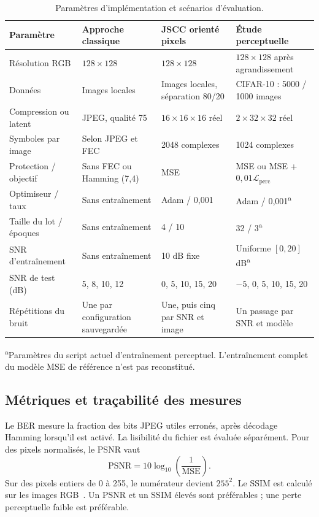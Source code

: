 \documentclass[conference]{IEEEtran}
\begin{document}
\begin{table}[!t]
\centering
\caption{Paramètres d'implémentation et scénarios d'évaluation.}
\label{tab:settings}
\setlength{\tabcolsep}{5pt}
\begin{tabular}{p{3.4cm}p{3.6cm}p{3.8cm}p{4.5cm}}
\toprule
Paramètre & Approche classique & JSCC orienté pixels & Étude perceptuelle \\
\midrule
Résolution RGB & $128\times128$ & $128\times128$ & $128\times128$ après agrandissement \\
Données & Images locales & Images locales, séparation 80/20 & CIFAR-10 : 5000 / 1000 images \\
Compression ou latent & JPEG, qualité 75 & $16\times16\times16$ réel & $2\times32\times32$ réel \\
Symboles par image & Selon JPEG et FEC & 2048 complexes & 1024 complexes \\
Protection / objectif & Sans FEC ou Hamming (7,4) & MSE & MSE ou MSE + $0{,}01\mathcal L_{\mathrm{perc}}$ \\
Optimiseur / taux & Sans entraînement & Adam / 0,001 & Adam / 0,001\textsuperscript{a} \\
Taille du lot / époques & Sans entraînement & 4 / 10 & 32 / 3\textsuperscript{a} \\
SNR d'entraînement & Sans entraînement & 10 dB fixe & Uniforme $[0,20]$ dB\textsuperscript{a} \\
SNR de test (dB) & 5, 8, 10, 12 & 0, 5, 10, 15, 20 & $-5$, 0, 5, 10, 15, 20 \\
Répétitions du bruit & Une par configuration sauvegardée & Une, puis cinq par SNR et image & Un passage par SNR et modèle \\
\bottomrule
\end{tabular}
\par\smallskip\footnotesize
\textsuperscript{a}Paramètres du script actuel d'entraînement perceptuel.
L'entraînement complet du modèle MSE de référence n'est pas reconstitué.
\end{table}

\subsection{Métriques et traçabilité des mesures}
Le BER mesure la fraction des bits JPEG utiles erronés, après
décodage Hamming lorsqu'il est activé. La lisibilité du fichier est
évaluée séparément. Pour des pixels normalisés, le PSNR vaut
\begin{equation}
\mathrm{PSNR}=10\log_{10}\left(\frac1{\mathrm{MSE}}\right).
\end{equation}
Sur des pixels entiers de 0 à 255, le numérateur devient $255^2$.
Le SSIM est calculé sur les images RGB~\cite{ssim}. Un PSNR et un
SSIM élevés sont préférables ; une perte perceptuelle faible est préférable.
\end{document}
